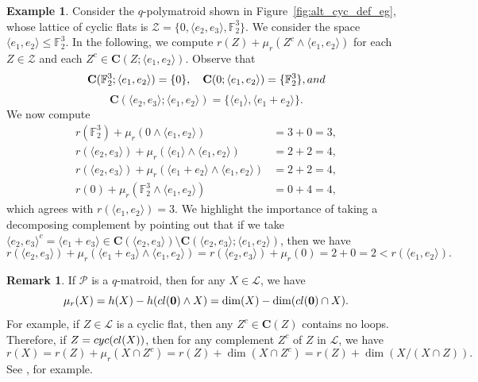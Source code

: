 \documentclass[a4paper,11pt,reqno]{article}
\theoremstyle{definition}
\newtheorem{example}[theorem]{{{Example}}}
\newtheorem{remark}[theorem]{{{Remark}}}
\newcommand{\mL}{\mathcal{L}}
\newcommand{\mP}{\mathcal{P}}
\newcommand{\zero}{{\mathbf{0}}}
\begin{document}
\begin{example}
    Consider the $q$-polymatroid shown in Figure~\ref{fig:alt_cyc_def_eg}, whose lattice of cyclic flats is $\mathcal{Z}=\{0,\langle e_2,e_3\rangle,\mathbb{F}_2^3\}$. We consider the space $\langle e_1,e_2\rangle\leq\mathbb{F}_2^3$. In the following, we compute $r(Z)+\mu_r(Z^c\wedge\langle e_1,e_2\rangle)$ for each $Z\in\mathcal{Z}$ and each $Z^c\in\mathbf{C}(Z;\langle e_1,e_2\rangle)$. Observe that 
    $$\mathbf{C}(\mathbb{F}_2^3;\langle e_1,e_2\rangle)=\{0\},\quad\mathbf{C}(0;\langle e_1,e_2\rangle)=\{\mathbb{F}_2^3\},\textup{ and}$$
    $$\mathbf{C}(\langle e_2,e_3\rangle;\langle e_1,e_2\rangle)=\{\langle e_1\rangle,\langle e_1+e_2\rangle\}.$$
    We now compute
    \begin{align*}
        r(\mathbb{F}_2^3)+\mu_r(0\wedge\langle e_1,e_2\rangle)&=3+0=3,\\
        r(\langle e_2,e_3\rangle)+\mu_r(\langle e_1\rangle\wedge \langle e_1,e_2\rangle)&=2+2=4,\\
        r(\langle e_2,e_3\rangle)+\mu_r(\langle e_1+e_2\rangle\wedge \langle e_1,e_2\rangle)&=2+2=4,\\
        r(0)+\mu_r(\mathbb{F}_2^3\wedge\langle e_1,e_2\rangle)&=0+4=4,
    \end{align*}
    which agrees with $r(\langle e_1,e_2\rangle)=3$. We highlight the importance of taking a decomposing complement by pointing out that if we take $\langle e_2,e_3\rangle^c=\langle e_1+e_3\rangle\in\mathbf{C}(\langle e_2,e_3\rangle)\setminus\mathbf{C}(\langle e_2,e_3\rangle;\langle e_1,e_2\rangle)$, then we have
    $$r(\langle e_2,e_3\rangle)+\mu_r(\langle e_1+e_3\rangle\wedge \langle e_1,e_2\rangle)=r(\langle e_2,e_3\rangle)+\mu_r(0)=2+0=2<r(\langle e_1,e_2\rangle).$$
\end{example}

\begin{remark}\label{rem:q-mat_mu}
    If $\mP$ is a $q$-matroid, then for any $X\in\mathcal{L}$, we have  
    \[
        \mu_r(X) = \textup{h}(X) - \textup{h}(\textup{cl}(\zero) \wedge X) = \dim(X) - \dim(\textup{cl}(\zero) \cap X).
    \]
    For example, if $Z\in\mathcal{L}$ is a cyclic flat, then any $Z^c\in\mathbf{C}(Z)$ contains no loops. Therefore, if $Z=\textup{cyc}(\textup{cl}(X))$, then for any complement $Z^c$ of $Z$ in $\mL$, we have  
    \[
        r(X) = r(Z) + \mu_r(X \cap Z^c) = r(Z) + \dim(X \cap Z^c) = r(Z) + \dim(X / (X \cap Z)).
    \]
    See \cite[Lemma 2.25]{AlfByr22}, for example.
\end{remark}
\end{document}

